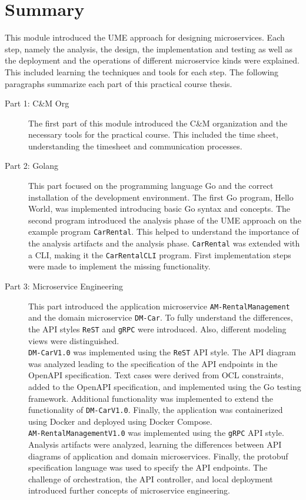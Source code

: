 \chapter{Summary}
\label{cha:summary_outlook}
This module introduced the UME approach for designing microservices.
Each step, namely the analysis, the design, the implementation and testing as well as the deployment and the operations of different microservice kinds were explained.
This included learning the techniques and tools for each step.
The following paragraphs summarize each part of this practical course thesis.

\begin{description}
    \item[Part 1: C\&M Org] The first part of this module introduced the C\&M organization and the necessary tools for the practical course.
    This included the time sheet, understanding the timesheet and communication processes.
    \item[Part 2: Golang] This part focused on the programming language Go and the correct installation of the development environment.
    The first Go program, Hello World, was implemented introducing basic Go syntax and concepts.
    The second program introduced the analysis phase of the UME approach on the example program \texttt{CarRental}.
    This helped to understand the importance of the analysis artifacts and the analysis phase.
    \texttt{CarRental} was extended with a CLI, making it the \texttt{CarRentalCLI} program.
    First implementation steps were made to implement the missing functionality.
    \item[Part 3: Microservice Engineering] This part introduced the application microservice \texttt{AM-RentalManagement} and the domain microservice \texttt{DM-Car}.
    To fully understand the differences, the API styles \texttt{ReST} and \texttt{gRPC} were introduced.
    Also, different modeling views were distinguished. \\
    \texttt{DM-CarV1.0} was implemented using the \texttt{ReST} API style.
    The API diagram was analyzed leading to the specification of the API endpoints in the OpenAPI specification.
    Text cases were derived from OCL constraints, added to the OpenAPI specification, and implemented using the Go testing framework.
    Additional functionality was implemented to extend the functionality of \texttt{DM-CarV1.0}.
    Finally, the application was containerized using Docker and deployed using Docker Compose. \\
    \texttt{AM-RentalManagementV1.0} was implemented using the \texttt{gRPC} API style.
    Analysis artifacts were analyzed, learning the differences between API diagrams of application and domain microservices.
    Finally, the protobuf specification language was used to specify the API endpoints.
    The challenge of orchestration, the API controller, and local deployment introduced further concepts of microservice engineering.
\end{description}

